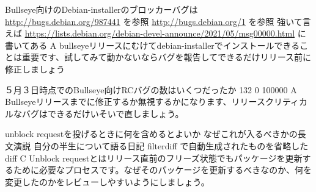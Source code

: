 %

\santaku
{Bullseye向けのDebian-installerのブロッカーバグは}
{\url{http://bugs.debian.org/987441} を参照}
{\url{http://bugs.debian.org/1} を参照 }
{強いて言えば \url{https://lists.debian.org/debian-devel-announce/2021/05/msg00000.html} に書いてある}
{A}
{bullseyeリリースにむけてdebian-installerでインストールできることは重要です、試してみて動かないならバグを報告してできるだけリリース前に修正しましょう}

\santaku
{５月３日時点でのBullseye向けRCバグの数はいくつだったか}
{132}
{0}
{100000}
{A}
{Bullseyeリリースまでに修正するか無視するかになります、リリースクリティカルなバグはできるだけいそいで直しましょう。}

\santaku
{unblock requestを投げるときに何を含めるとよいか}
{なぜこれが入るべきかの長文演説}
{自分の半生について語る日記}
{filterdiff で自動生成されたものを省略したdiff}
{C}
{Unblock requestとはリリース直前のフリーズ状態でもパッケージを更新するために必要なプロセスです。なぜそのパッケージを更新するべきなのか、何を変更したのかをレビューしやすいようにしましょう。}
